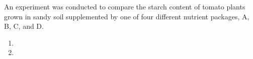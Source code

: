 An experiment was conducted to compare the starch content of tomato plants grown in
sandy soil supplemented by one of four different nutrient packages, A, B, C, and D.
\begin{enumerate}[label={(\alph*)}]
    \item 
    \item 
\end{enumerate}